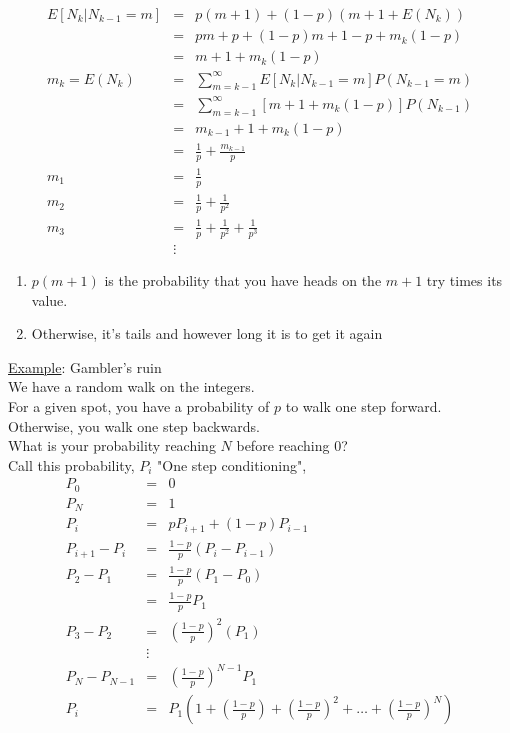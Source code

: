     \begin{eqnarray*}
      E[N_k | N_{k-1} = m] & = & 
        p(m+1) + (1-p)(m+1 + E(N_k))\\
        & = & pm + p + (1-p)m + 1-p + m_k (1 - p)\\
        & = & m+1 + m_k(1-p)\\
      m_k = E(N_k) & = & \sum_{m=k-1}^{\infty} E[N_k|N_{k-1}=m] P(N_{k-1} = m)\\
        & = & \sum_{m=k-1}^{\infty} [m+1 + m_k(1-p)] P(N_{k-1})\\
        & = & m_{k-1} + 1 + m_k(1-p)\\
        & = & \frac{1}{p} + \frac{m_{k-1}}{p}\\
      m_1 & = & \frac{1}{p}\\
      m_2 & = & \frac{1}{p} + \frac{1}{p^2}\\
      m_3 & = & \frac{1}{p} + \frac{1}{p^2} + \frac{1}{p^3}\\
      & \vdots &
    \end{eqnarray*}
    \begin{enumerate}
      \item $p(m+1)$ is the probability that you have heads on the $m+1$ try times
        its value.
      \item Otherwise, it's tails and however long it is to get it again
    \end{enumerate}
  \underline{Example}: Gambler's ruin\\
    We have a random walk on the integers.\\
    For a given spot, you have a probability of $p$ to walk one step forward.\\
    Otherwise, you walk one step backwards.\\
    What is your probability reaching $N$ before reaching $0$?\\
    Call this probability, $P_i$
    "One step conditioning",
    \begin{eqnarray*}
      P_0 & = & 0\\
      P_N & = & 1\\
      P_i & = & pP_{i+1} + (1-p)P_{i-1}\\
      P_{i+1} - P_{i} & = & \frac{1-p}{p} (P_i - P_{i-1})\\
      P_2 - P_1 & = & \frac{1-p}{p}(P_1 - P_0)\\
        & = & \frac{1-p}{p}P_1\\
      P_3 - P_2 & = & \left(\frac{1-p}{p}\right)^2(P_1)\\
      & \vdots&\\
      P_N - P_{N-1} & = & \left(\frac{1-p}{p}\right)^{N-1}P_1\\
      P_i & = & P_1\left(1 + \left(\frac{1-p}{p}\right)+ \left(\frac{1-p}{p}\right)^2+ \ldots+ \left(\frac{1-p}{p}\right)^N\right) 
    \end{eqnarray*}
